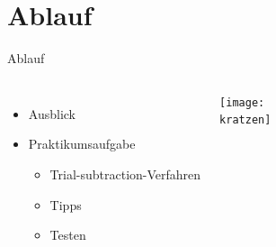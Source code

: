 
  \section{Ablauf}
  \begin{frame}{Ablauf}
    \begin{columns}
        \begin{itemize}
          \item Ausblick
          \item Praktikumsaufgabe
          \begin{itemize}
            \item Trial-subtraction-Verfahren
            \item Tipps
            \item Testen
          \end{itemize}
        \end{itemize}
        \begin{center}
          \texttt{[image: \\kratzen]}
        \end{center}
    \end{columns}
  \end{frame}


